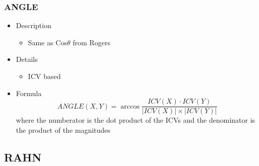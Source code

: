 \documentclass{article}
\begin{document}
\subsubsection{ANGLE}
\label{sec-6-5-4}
\begin{itemize}

\item Description
\label{sec-6-5-4-1}%
\begin{itemize}
\item Same as Cos$\theta$ from Rogers
\end{itemize}

\item Details
\label{sec-6-5-4-2}%
\begin{itemize}
\item ICV based
\end{itemize}

\item Formula\\
\label{sec-6-5-4-3}%
$$ ANGLE(X,Y)= \arccos{\frac{ICV(X) \cdot
ICV(Y)}{|ICV(X)|\times |ICV(Y)|}} $$ 
where the numberator is the dot product of the ICVs 
and the denominator is the product of the magnitudes
\end{itemize} %
\subsection{RAHN}
\label{sec-6-6}
\end{document}
